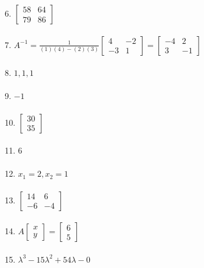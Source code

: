 \documentclass[fleqn]{article}
\begin{document}
6. \( \begin{bmatrix} 58 & 64 \\ 79 & 86 \end{bmatrix} \) \\\\

7. \( A^{-1} = \frac{1}{(1)(4) - (2)(3)} \begin{bmatrix} 4 & -2 \\ -3 & 1 \end{bmatrix} = \begin{bmatrix} -4 & 2 \\ 3 & -1 \end{bmatrix} \) \\\\

8. \( 1, 1, 1 \) \\\\

9. \( -1 \) \\\\

10. \( \begin{bmatrix} 30 \\ 35 \end{bmatrix} \) \\\\

11. \( 6 \) \\\\

12. \( x_1 = 2, x_2 = 1 \) \\\\

13. \( \begin{bmatrix} 14 & 6 \\ -6 & -4 \end{bmatrix} \) \\\\

14. \( A \begin{bmatrix} x \\ y \end{bmatrix} = \begin{bmatrix} 6 \\ 5 \end{bmatrix} \) \\\\

15. \( \lambda^3 - 15\lambda^2 + 54\lambda - 0 \) \\\\      
        
\end{document}
